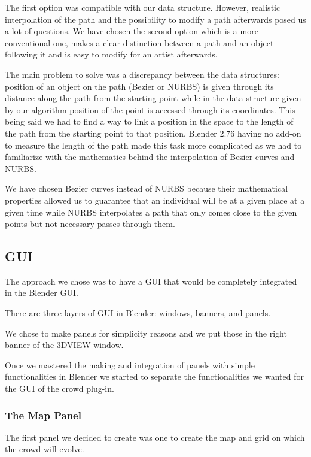 The first option was compatible with our data structure. However,
realistic interpolation of the path and the possibility to modify a path
afterwards posed us a lot of questions. We have chosen the second
option which is a more conventional one, makes a clear distinction
between a path and an object following it and is easy to modify for an
artist afterwards.

The main problem to solve was a discrepancy between the data
structures: position of an object on the path (Bezier or NURBS) is
given through its distance along the path from the starting point
while in the data structure given by our algorithm position of the
point is accessed through its coordinates. This being said we
had to find a way to link a position in the space to the length of the
path from the starting point to that position. Blender 2.76 having no
add-on to measure the length of the path made this task more
complicated as we had to familiarize with the mathematics behind the
interpolation of Bezier curves and NURBS.

We have chosen Bezier curves instead of NURBS because their
mathematical properties allowed us to guarantee that an individual
will be at a given place at a given time while NURBS interpolates a
path that only comes close to the given points but not necessary
passes through them.

\subsection{GUI} 


The approach we chose was to have a GUI that would be completely integrated in
the Blender GUI.

There are three layers of GUI in Blender: windows, banners, and
panels.

We chose to make panels for simplicity reasons and we put those in the
right banner of the 3DVIEW window.

Once we mastered the making and integration of panels with simple
functionalities in Blender we started to separate the functionalities
we wanted for the GUI of the crowd plug-in.

\subsubsection{The Map Panel}


The first panel we decided to create was one to create the map and
grid on which the crowd will evolve.

